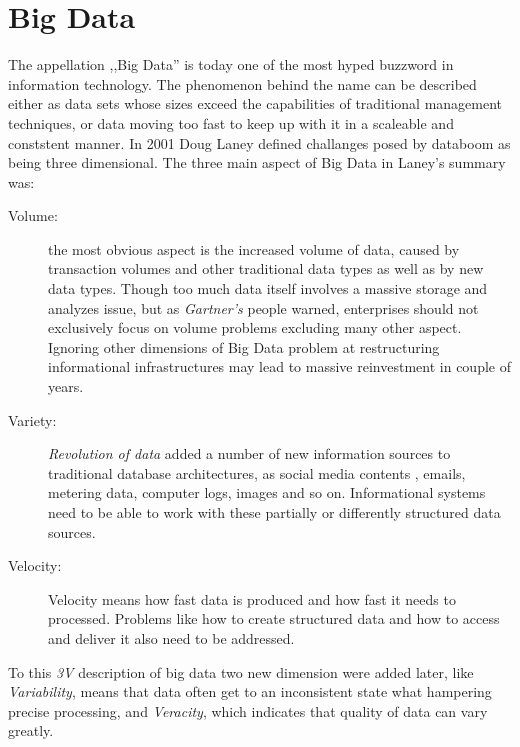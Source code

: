 \section{Big Data}\label{bigdata}
The appellation ,,Big Data'' is today one of the most hyped buzzword in information technology. The phenomenon behind the name can be described either 
as data sets whose sizes  exceed the capabilities of traditional management techniques, or data moving too fast to keep up with it in a scaleable and 
conststent manner. In 2001 Doug Laney defined challanges posed by databoom as being three dimensional\cite{3v}. The three main aspect of Big Data in Laney's summary was:
\begin{description}

\item[Volume:]
 the most obvious aspect is the increased volume of data, caused by transaction volumes and other traditional data types as well as by new data types. 
Though too much data itself involves a massive storage and analyzes issue, but as \textit{Gartner's} people warned\cite{3v},  enterprises should not exclusively focus on volume problems excluding many other aspect. Ignoring other dimensions of Big Data problem at restructuring  informational infrastructures may lead to massive reinvestment in couple of years. 
\item[Variety:] \textit{Revolution of data} added a number of new information sources to traditional database architectures, as social media contents , emails,  metering data, 
computer logs, images and so on. Informational systems need to be able to work with these partially or differently structured data sources. 
\item[Velocity:] Velocity means how fast data is produced and how fast it needs to processed. Problems like how to create structured data and
 how to access and deliver it also need to be addressed.
\end{description}
To this \textit{3V} description of big data two new dimension were added later, like \textit{Variability}, means that data often get to an inconsistent state what hampering precise processing, and \textit{Veracity}, which indicates that quality of data can vary greatly. 

